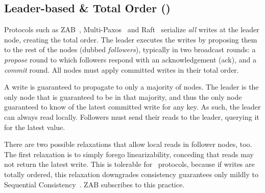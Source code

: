 
% 



\subsection{Leader-based \& Total Order (\LTO)}\label{sec:tax:lto}
Protocols such as ZAB~\cite{Hunt:2010}, Multi-Paxos~\cite{Lamport:2001} and Raft~\cite{Ongaro:2014} serialize \emph{all} writes at the leader node, creating the total order. The leader executes the writes by proposing them to the rest of the nodes (dubbed \emph{followers}), typically in two broadcast rounds: a \emph{propose} round to which followers respond with an acknowledgement (ack), and a \emph{commit} round. All nodes must apply committed writes in their total order.  

A write is guaranteed to propagate to only a majority of nodes. The leader is the
only node that is guaranteed to be in that majority, and thus the only node guaranteed to know of the latest committed write for any key.
As such, the leader can always read locally.
Followers must send their reads to the leader, querying it for the latest value.

There are two possible relaxations that allow local reads in follower nodes, too. 
The first relaxation is to simply forego linearizability, conceding that reads may not return the latest write. This is tolerable 
for \LTO~protocols, because if writes are totally ordered, this relaxation downgrades consistency guarantees only mildly to Sequential Consistency~\cite{LevAri:2017}. ZAB subscribes to this practice.

